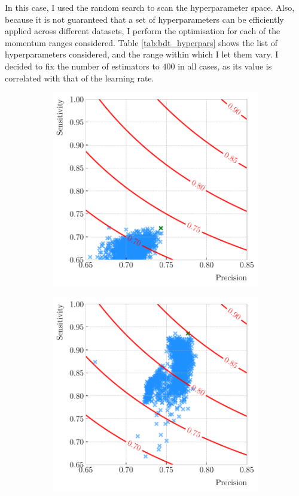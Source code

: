 In this case, I used the random search to scan the hyperparameter space. Also, because it is not guaranteed that a set of hyperparameters can be efficiently applied across different datasets, I perform the optimisation for each of the momentum ranges considered. Table \ref{tab:bdt_hyperpars} shows the list of hyperparameters considered, and the range within which I let them vary. I decided to fix the number of estimators to $400$ in all cases, as its value is correlated with that of the learning rate.

\begin{figure}[t]
	\begin{subfigure}{0.32\textwidth}
		\centering
		\includegraphics[width=.99\linewidth]{Images/GArSoft_PID/BDT/precision_vs_sensitivity_p0_0.20_sigmap_0.10.pdf}
	\end{subfigure}
	\begin{subfigure}{0.32\textwidth}
		\centering
		\includegraphics[width=.99\linewidth]{Images/GArSoft_PID/BDT/precision_vs_sensitivity_p0_1.15_sigmap_0.35.pdf}

\end{subfigure}
\end{figure}

